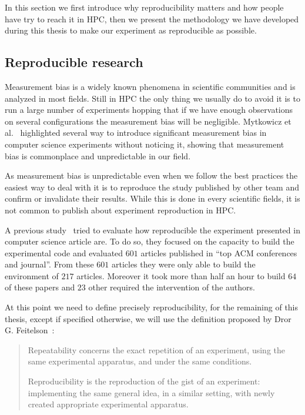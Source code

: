 In this section we first introduce why reproducibility matters and how people
have try to reach it in \gls{HPC}, then we present the methodology we have
developed during this thesis to make our experiment as reproducible as
possible.


\subsection{Reproducible research}

Measurement bias is a widely known phenomena in scientific communities and is
analyzed in most fields. Still in \gls{HPC} the only thing we usually do to avoid it
is to run a large number of experiments hopping that if we have enough
observations on several configurations the measurement bias will be
negligible. Mytkowicz et al.~\cite{Mytkowicz09Producing} highlighted several
way to introduce significant measurement bias in computer science experiments
without noticing it, showing that measurement bias is commonplace and
unpredictable in our field.

As measurement bias is unpredictable even when we follow the best practices
the easiest way to deal with it is to reproduce the study published by other
team and confirm or invalidate their results. While this is done in every
scientific fields, it is not common to publish about experiment reproduction
in \gls{HPC}.

A previous study~\cite{Collberg15Repeatability} tried to evaluate how
reproducible the experiment presented in computer science article are. To do
so, they focused on the capacity to build the experimental code and evaluated
$601$ articles published in “top ACM conferences and journal”. From these
$601$ articles they were only able to build the environment of $217$ articles.
Moreover it took more than half an hour to build $64$ of these papers and $23$
other required the intervention of the authors.

At this point we need to define precisely reproducibility, for the remaining
of this thesis, except if specified otherwise, we will use the definition
proposed by Dror G. Feitelson~\cite{Feitelson15From}:

\begin{quote}
    Repeatability concerns the exact repetition of an experiment, using the
    same experimental apparatus, and under the same conditions.

    Reproducibility is the reproduction of the gist of an experiment:
    implementing the same general idea, in a similar setting, with newly
    created appropriate experimental apparatus.
\end{quote}

